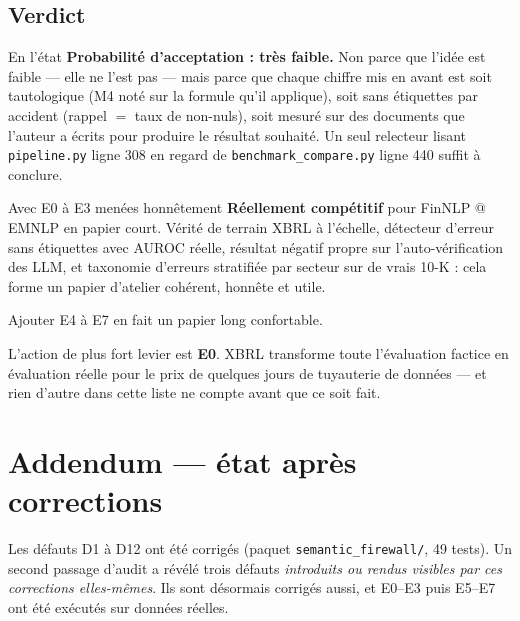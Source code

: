\documentclass[11pt,a4paper]{article}
\newcommand{\fic}[1]{\texttt{\small #1}}
\begin{document}
\subsection*{Verdict}

\begin{fatal}{En l'état}
\textbf{Probabilité d'acceptation : très faible.} Non parce que l'idée est
faible --- elle ne l'est pas --- mais parce que chaque chiffre mis en avant est
soit tautologique (M4 noté sur la formule qu'il applique), soit sans étiquettes
par accident (rappel $=$ taux de non-nuls), soit mesuré sur des documents que
l'auteur a écrits pour produire le résultat souhaité. Un seul relecteur lisant
\fic{pipeline.py} ligne 308 en regard de \fic{benchmark\_compare.py} ligne 440
suffit à conclure.
\end{fatal}

\begin{bon}{Avec E0 à E3 menées honnêtement}
\textbf{Réellement compétitif} pour FinNLP @ EMNLP en papier court. Vérité de
terrain XBRL à l'échelle, détecteur d'erreur sans étiquettes avec AUROC réelle,
résultat négatif propre sur l'auto-vérification des LLM, et taxonomie d'erreurs
stratifiée par secteur sur de vrais 10-K : cela forme un papier d'atelier
cohérent, honnête et utile.

Ajouter E4 à E7 en fait un papier long confortable.
\end{bon}

\vspace{6pt}
\noindent
L'action de plus fort levier est \textbf{E0}. XBRL transforme toute l'évaluation
factice en évaluation réelle pour le prix de quelques jours de tuyauterie de
données --- et rien d'autre dans cette liste ne compte avant que ce soit fait.

\section{Addendum --- état après corrections}
\label{sec:addendum}

Les défauts D1 à D12 ont été corrigés (paquet \fic{semantic\_firewall/}, 49 tests).
Un second passage d'audit a révélé trois défauts \emph{introduits ou rendus visibles
par ces corrections elles-mêmes}. Ils sont désormais corrigés aussi, et E0--E3 puis
E5--E7 ont été exécutés sur données réelles.
\end{document}
